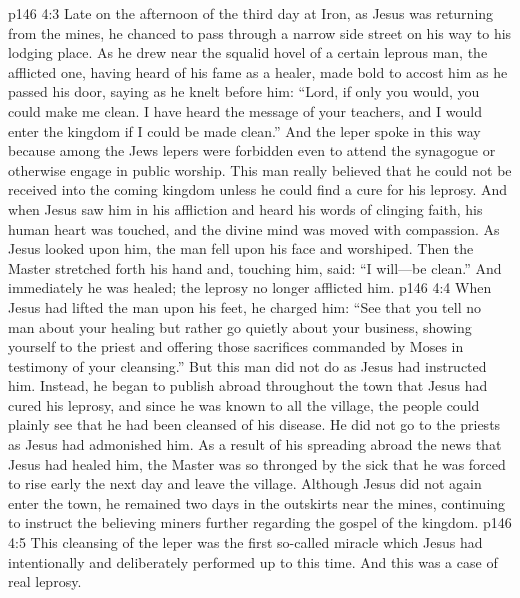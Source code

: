 \pc \vs p146 4:3 Late on the afternoon of the third day at Iron, as Jesus was returning from the mines, he chanced to pass through a narrow side street on his way to his lodging place. As he drew near the squalid hovel of a certain leprous man, the afflicted one, having heard of his fame as a healer, made bold to accost him as he passed his door, saying as he knelt before him: “Lord, if only you would, you could make me clean. I have heard the message of your teachers, and I would enter the kingdom if I could be made clean.” And the leper spoke in this way because among the Jews lepers were forbidden even to attend the synagogue or otherwise engage in public worship. This man really believed that he could not be received into the coming kingdom unless he could find a cure for his leprosy. And when Jesus saw him in his affliction and heard his words of clinging faith, his human heart was touched, and the divine mind was moved with compassion. As Jesus looked upon him, the man fell upon his face and worshiped. Then the Master stretched forth his hand and, touching him, said: \textcolor{ubdarkred}{“I will---be clean.”} And immediately he was healed; the leprosy no longer afflicted him.
\vs p146 4:4 When Jesus had lifted the man upon his feet, he charged him: \textcolor{ubdarkred}{“See that you tell no man about your healing but rather go quietly about your business, showing yourself to the priest and offering those sacrifices commanded by Moses in testimony of your cleansing.”} But this man did not do as Jesus had instructed him. Instead, he began to publish abroad throughout the town that Jesus had cured his leprosy, and since he was known to all the village, the people could plainly see that he had been cleansed of his disease. He did not go to the priests as Jesus had admonished him. As a result of his spreading abroad the news that Jesus had healed him, the Master was so thronged by the sick that he was forced to rise early the next day and leave the village. Although Jesus did not again enter the town, he remained two days in the outskirts near the mines, continuing to instruct the believing miners further regarding the gospel of the kingdom.
\vs p146 4:5 This cleansing of the leper was the first so\hyp{}called miracle which Jesus had intentionally and deliberately performed up to this time. And this was a case of real leprosy.
